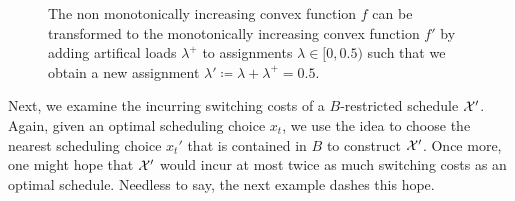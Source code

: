 \begin{figure}[H]
\captionsetup[subfigure]{labelformat=empty}
\begin{subfigure}[b]{0.5\textwidth}

\end{subfigure}
\hfill
\begin{subfigure}[b]{0.5\textwidth}

\end{subfigure}
\caption{The non monotonically increasing convex function $f$ can be transformed to the monotonically increasing convex function $f'$ by adding artifical loads $\lambda^+$ to assignments $\lambda\in[0,0.5)$ such that we obtain a new assignment $\lambda'\coloneqq\lambda+\lambda^+=0.5$.}
\label{fig:transform_to_mono_incr}
\end{figure}
Next, we examine the incurring switching costs of a $B$-restricted schedule $\mathcal{X}'$. Again, given an optimal scheduling choice $x_t$, we use the idea to choose the nearest scheduling choice $x_t'$ that is contained in $B$ to construct $\mathcal{X}'$. Once more, one might hope that $\mathcal{X}'$ would incur at most twice as much switching costs as an optimal schedule. Needless to say, the next example dashes this hope.
